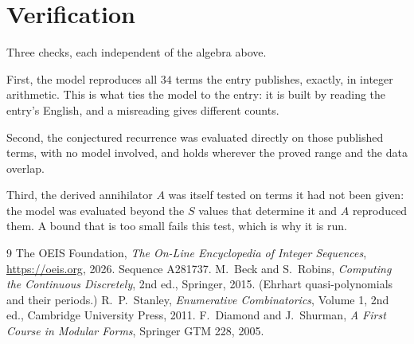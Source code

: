 \documentclass[11pt,a4paper]{article}
\theoremstyle{plain}
\theoremstyle{definition}
\begin{document}
\section{Verification}

Three checks, each independent of the algebra above.

First, the model reproduces all $34$ terms the entry publishes, exactly, in integer
arithmetic. This is what ties the model to the entry: it is built by reading the entry's
English, and a misreading gives different counts.

Second, the conjectured recurrence was evaluated directly on those published terms, with no
model involved, and holds wherever the proved range and the data overlap.

Third, the derived annihilator $A$ was itself tested on terms it had not been given: the model
was evaluated beyond the $S$ values that determine it and $A$ reproduced them. A bound that is
too small fails this test, which is why it is run.

\begin{thebibliography}{9}
 The OEIS Foundation, \emph{The On-Line Encyclopedia of Integer
Sequences}, \url{https://oeis.org}, 2026. Sequence A281737.
 M.~Beck and S.~Robins, \emph{Computing the Continuous Discretely},
2nd ed., Springer, 2015. (Ehrhart quasi-polynomials and their periods.)
 R.~P.~Stanley, \emph{Enumerative Combinatorics}, Volume 1, 2nd ed.,
Cambridge University Press, 2011.
 F.~Diamond and J.~Shurman, \emph{A First Course in Modular Forms},
Springer GTM 228, 2005.
\end{thebibliography}
\end{document}
